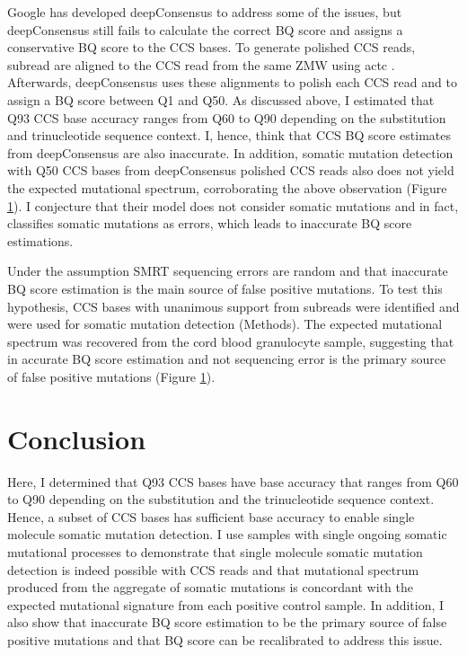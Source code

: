 
Google has developed deepConsensus to address some of the issues, but deepConsensus still fails to calculate the correct BQ score and assigns a conservative BQ score to the CCS bases. To generate polished CCS reads, subread are aligned to the CCS read from the same ZMW using actc \cite{}. Afterwards, deepConsensus uses these alignments to polish each CCS read and to assign a BQ score between Q1 and Q50. As discussed above, I estimated that Q93 CCS base accuracy ranges from Q60 to Q90 depending on the substitution and trinucleotide sequence context. I, hence, think that CCS BQ score estimates from deepConsensus are also inaccurate. In addition, somatic mutation detection with Q50 CCS bases from deepConsensus polished CCS reads also does not yield the expected mutational spectrum, corroborating the above observation (Figure \ref{}). I conjecture that their model does not consider somatic mutations and in fact, classifies somatic mutations as errors, which leads to inaccurate BQ score estimations.  


Under the assumption SMRT sequencing errors are random and that inaccurate BQ score estimation is the main source of false positive mutations. To test this hypothesis, CCS bases with unanimous support from subreads were identified and were used for somatic mutation detection (Methods). The expected mutational spectrum was recovered from the cord blood granulocyte sample, suggesting that in accurate BQ score estimation and not sequencing error is the primary source of false positive mutations (Figure \ref{}). 



\section{Conclusion}

Here, I determined that Q93 CCS bases have base accuracy that ranges from Q60 to Q90 depending on the substitution and the trinucleotide sequence context. Hence, a subset of CCS bases has sufficient base accuracy to enable single molecule somatic mutation detection. I use samples with single ongoing somatic mutational processes to demonstrate that single molecule somatic mutation detection is indeed possible with CCS reads and that mutational spectrum produced from the aggregate of somatic mutations is concordant with the expected mutational signature from each positive control sample. In addition, I also show that inaccurate BQ score estimation to be the primary source of false positive mutations and that BQ score can be recalibrated to address this issue. 

